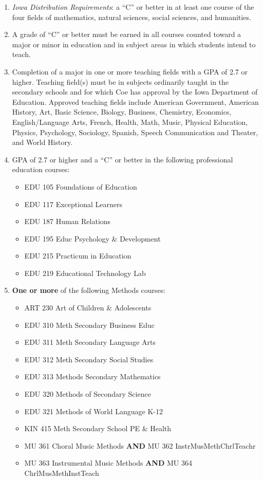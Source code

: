 \documentclass[
  letterpaper,
]{scrbook}
\providecommand{\tightlist}{%
  \setlength{\itemsep}{0pt}\setlength{\parskip}{0pt}}
\begin{document}
\begin{enumerate}
\def\labelenumi{\arabic{enumi}.}
\tightlist
\item
  \emph{Iowa Distribution Requirements}: a ``C'' or better in at least
  one course of the four fields of mathematics, natural sciences, social
  sciences, and humanities.
\item
  A grade of ``C'' or better must be earned in all courses counted
  toward a major or minor in education and in subject areas in which
  students intend to teach.
\item
  Completion of a major in one or more teaching fields with a GPA of 2.7
  or higher. Teaching field(s) must be in subjects ordinarily taught in
  the secondary schools and for which Coe has approval by the Iowa
  Department of Education. Approved teaching fields include American
  Government, American History, Art, Basic Science, Biology, Business,
  Chemistry, Economics, English/Language Arts, French, Health, Math,
  Music, Physical Education, Physics, Psychology, Sociology, Spanish,
  Speech Communication and Theater, and World History.
\item
  GPA of 2.7 or higher and a ``C'' or better in the following
  professional education courses:

  \begin{itemize}
  \tightlist
  \item
    EDU 105 Foundations of Education
  \item
    EDU 117 Exceptional Learners
  \item
    EDU 187 Human Relations
  \item
    EDU 195 Educ Psychology \& Development
  \item
    EDU 215 Practicum in Education
  \item
    EDU 219 Educational Technology Lab
  \end{itemize}
\item
  \textbf{One or more} of the following Methods courses:

  \begin{itemize}
  \tightlist
  \item
    ART 230 Art of Children \& Adolescents
  \item
    EDU 310 Meth Secondary Business Educ
  \item
    EDU 311 Meth Secondary Language Arts
  \item
    EDU 312 Meth Secondary Social Studies
  \item
    EDU 313 Methods Secondary Mathematics
  \item
    EDU 320 Methods of Secondary Science
  \item
    EDU 321 Methods of World Language K-12
  \item
    KIN 415 Meth Secondary School PE \& Health
  \item
    MU 361 Choral Music Methods \textbf{AND} MU 362
    InstrMusMethChrlTeachr
  \item
    MU 363 Instrumental Music Methods \textbf{AND} MU 364
    ChrlMusMethInstTeach
  \end{itemize}
\end{enumerate}
\end{document}
